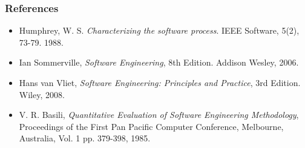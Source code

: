 \documentclass{beamer}
\begin{document}
\begin{frame}
 \frametitle{References}
 \begin{itemize}
  \item Humphrey, W. S. \textit{Characterizing the software process}.
IEEE Software, 5(2), 73-79. 1988.
  \item Ian Sommerville, \textit{Software Engineering}, 8th Edition. Addison Wesley, 2006.
  \item Hans van Vliet, \textit{Software Engineering: Principles and Practice}, 3rd Edition.
Wiley, 2008.
  \item V. R. Basili, \textit{Quantitative Evaluation of Software Engineering Methodology}, 
Proceedings of the First Pan Pacific Computer Conference, Melbourne, 
Australia, Vol. 1 pp. 379-398, 1985.

  \end{itemize}

\end{frame}

\end{document}
